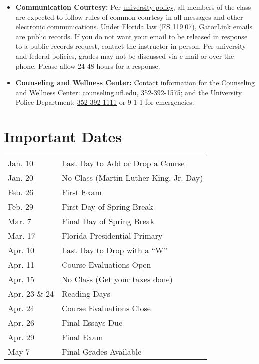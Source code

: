 \documentclass[11pt]{article}
\def\doubleq#1{``#1''}
\begin{document}
\begin{itemize}
	\item \textbf{Communication Courtesy:} Per {\href{http://teach.ufl.edu/wp-content/uploads/2012/08/NetiquetteGuideforOnlineCourses.pdf}{university policy}}, all members of the class are expected to follow rules of common courtesy in all messages and other electronic communications. Under Florida law ({\href{http://www.leg.state.fl.us/Statutes/index.cfm?App_mode=Display_Statute&URL=0100-0199/0119/Sections/0119.07.html}{FS 119.07}}), GatorLink emails are public records. If you do not want your email to be released in response to a public records request, contact the instructor in person. Per university and federal policies, grades may not be discussed via e-mail or over the phone. Please allow 24-48 hours for a response.
	\item \textbf{Counseling and Wellness Center:} Contact information for the Counseling and Wellness Center: {\href{https://counseling.ufl.edu}{counseling.ufl.edu}}, {\href{tel:3523921575}{352-392-1575}}; and the University Police Department: {\href{tel:3523921111}{352-392-1111}} or 9-1-1 for emergencies.
	\end{itemize}

\section{Important Dates}
\begin{tabular}{ l l}
Jan. 10 & Last Day to Add or Drop a Course \\
Jan. 20 & No Class (Martin Luther King, Jr. Day) \\
Feb. 26 & First Exam \\
Feb. 29 & First Day of Spring Break \\
Mar. 7 & Final Day of Spring Break \\
Mar. 17 & Florida Presidential Primary \\
Apr. 10 & Last Day to Drop with a \doubleq{W} \\
Apr. 11 & Course Evaluations Open \\
Apr. 15 & No Class (Get your taxes done) \\
Apr. 23 \& 24 & Reading Days \\
Apr. 24 & Course Evaluations Close \\
Apr. 26 & Final Essays Due \\
Apr. 29 & Final Exam \\
May 7 & Final Grades Available \\
\end{tabular}
\end{document}
